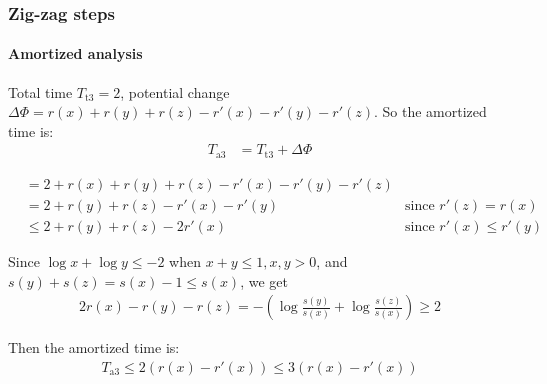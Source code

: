 \documentclass{beamer}
\theoremstyle{plain}
\begin{document}
    
    \begin{frame}
        \frametitle{Zig-zag steps}
        \framesubtitle{Amortized analysis}
    
        \begin{figure}
            \centering
        \end{figure}
    
        Total time $T_\mathrm{t3} = 2$, potential change $\Delta\varPhi = r(x) + r(y) + r(z) - r'(x) - r'(y) -r'(z)$. So the amortized time is: \pause
        \begin{align*}
            T_\mathrm{a3} &= T_\mathrm{t3} + \Delta\varPhi
        \end{align*}
    \end{frame}
    
    \begin{frame}
    
        \begin{align*}
            &= 2 + r(x) + r(y) + r(z) - r'(x) - r'(y) - r'(z) \\
            &= 2 + r(y) + r(z) - r'(x) - r'(y)  & \text{since } r'(z) = r(x) \\
            &\leq 2 + r(y) + r(z) - 2r'(x) & \text{since } r'(x) \leq r'(y)
        \end{align*}

        Since $\log x + \log y \leq -2$ when $x + y \leq 1, x,y > 0$, and $s(y) + s(z) = s(x) - 1 \leq s(x)$, we get
        \begin{align*}
            2r(x) - r(y) - r(z) = -(\log \frac{s(y)}{s(x)} + \log \frac{s(z)}{s(x)}) \geq  2
        \end{align*}

        Then the amortized time is:
        \begin{align*}
            T_\mathrm{a3} \leq 2(r(x) - r'(x)) \leq 3(r(x) - r'(x))
        \end{align*}
    
    \end{frame}
\end{document}
